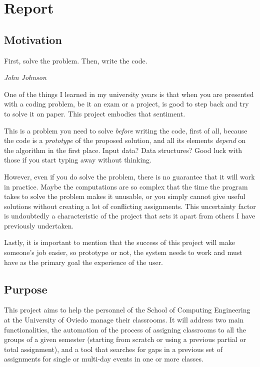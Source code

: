 \renewcommand{\documentname}{Report}

\chapter{Report}

\section{Motivation}

\epigraph{First, solve the problem. Then, write the code.}{\textit{John Johnson}}

One of the things I learned in my university years is that when you are presented with a coding problem, be it an exam or a project, is good to step back and try to solve it on paper. This project embodies that sentiment.

This is a problem you need to solve \textit{before} writing the code, first of all, because the code is a \textit{prototype} of the proposed solution, and all its elements \textit{depend} on the algorithm in the first place. Input data? Data structures? Good luck with those if you start typing away without thinking. 

However, even if you do solve the problem, there is no guarantee that it will work in practice. Maybe the computations are so complex that the time the program takes to solve the problem makes it unusable, or you simply cannot give useful solutions without creating a lot of conflicting assignments. This uncertainty factor is undoubtedly a characteristic of the project that sets it apart from others I have previously undertaken.

Lastly, it is important to mention that the success of this project will make someone's job easier, so prototype or not, the system needs to work and must have as the primary goal the experience of the user.


\section{Purpose}\label{purpose}

This project aims to help the personnel of the School of Computing Engineering at the University of Oviedo manage their classrooms. It will address two main functionalities, the automation of the process of assigning classrooms to all the groups of a given semester (starting from scratch or using a previous partial or total assignment), and a tool that searches for gaps in a previous set of assignments for single or multi-day events in one or more classes.

